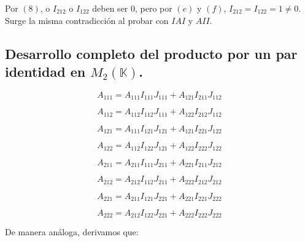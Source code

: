 Por $(8)$, o $I_{212}$ o $I_{122}$ deben ser $0$, pero por $(e)$ y $(f)$, $I_{212} = I_{122} = 1 \neq 0$. Surge la misma contradicción al probar con $IAI$ y $AII$.

\subsection{Desarrollo completo del producto por un par identidad en $M_2 (\mathbb{K})$.}

\begin{equation}
A_{111} = A_{111} I_{111} J_{111} + A_{121} I_{211} J_{112}
\end{equation}

\begin{equation}
A_{112} = A_{112} I_{112} J_{111} + A_{122} I_{212} J_{112}
\end{equation}

\begin{equation}
A_{121} = A_{111} I_{121} J_{121} + A_{121} I_{221} J_{122}
\end{equation}

\begin{equation}
A_{122} = A_{112} I_{122} J_{121} + A_{122} I_{222} J_{122}
\end{equation}

\begin{equation}
A_{211} = A_{211} I_{111} J_{211} + A_{221} I_{211} J_{212}
\end{equation}

\begin{equation}
A_{212} = A_{212} I_{112} J_{211} + A_{222} I_{212} J_{212}
\end{equation}

\begin{equation}
A_{221} = A_{211} I_{121} J_{221} + A_{221} I_{221} J_{222}
\end{equation}

\begin{equation}
A_{222} = A_{212} I_{122} J_{221} + A_{222} I_{222} J_{222}
\end{equation}

De manera análoga, derivamos que:

